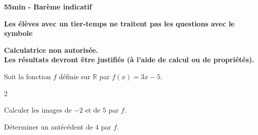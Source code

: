 \documentclass[11pt,a4paper]{article}  %
\begin{document}
	\graphicspath{{images/}}
	
	\begin{center}
		
		
	\end{center}

\begin{center}\textbf{55min - Barème indicatif}\end{center}
\begin{center}\textbf{Les élèves avec un tier-temps ne traitent pas les questions avec  le symbole }\end{center}
\begin{center}\textbf{Calculatrice non autorisée.\\Les résultats devront être justifiés (à l'aide de calcul ou de propriétés).}\end{center}


Soit la fonction $f$ définie sur $\mathbb{R}$ par $f(x)=3 x-5$.
\begin{multicols}{2}
	\begin{enumMet}
		\item Calculer les images de $-2$ et de $5$ par $f$.
		\item Déterminer un antécédent de $4$ par $f$.
	\end{enumMet}
\end{multicols}

\end{document}
